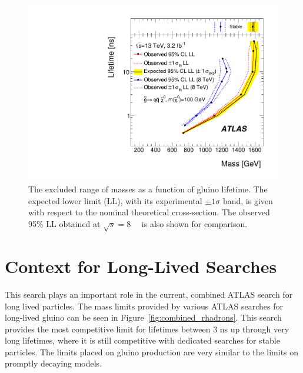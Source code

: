 \begin{figure}[htbp]
\centering
\includegraphics[width=\fullfig]{figures/taumass_exclusion.pdf}  
\caption{The excluded range of masses as a function of gluino lifetime. The expected lower limit (LL), with its experimental $\pm 1 \sigma$ band, is given with respect to the nominal theoretical cross-section. The observed 95\% LL obtained at $\sqrt{s} = 8$~\TeV~\cite{SUSY-2014-09} is also shown for comparison.}
\label{fig:mass_limits}
\end{figure}


\section{Context for Long-Lived Searches}
This search plays an important role in the current, combined ATLAS search for long lived particles.
The mass limits provided by various ATLAS searches for long-lived gluino \rhadrons can be seen in Figure~\ref{fig:combined_rhadrons}.
This search provides the most competitive limit for lifetimes between 3 ns up through very long lifetimes, where it is still competitive with dedicated searches for stable particles.
The limits placed on gluino production are very similar to the limits on promptly decaying models.


